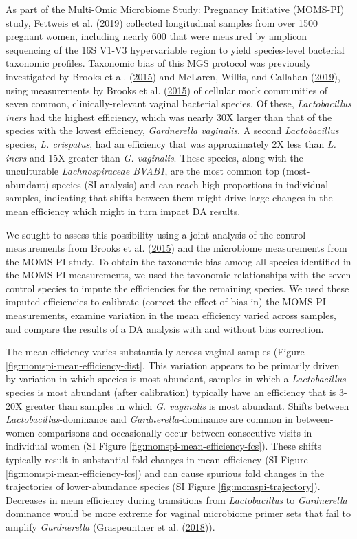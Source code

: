 \documentclass[
]{article}
\begin{document}
As part of the Multi-Omic Microbiome Study: Pregnancy Initiative (MOMS-PI) study, Fettweis et al. (\protect\hyperlink{ref-fettweis2019thev}{2019}) collected longitudinal samples from over 1500 pregnant women, including nearly 600 that were measured by amplicon sequencing of the 16S V1-V3 hypervariable region to yield species-level bacterial taxonomic profiles.
Taxonomic bias of this MGS protocol was previously investigated by Brooks et al. (\protect\hyperlink{ref-brooks2015thet}{2015}) and McLaren, Willis, and Callahan (\protect\hyperlink{ref-mclaren2019cons}{2019}), using measurements by Brooks et al. (\protect\hyperlink{ref-brooks2015thet}{2015}) of cellular mock communities of seven common, clinically-relevant vaginal bacterial species.
Of these, \emph{Lactobacillus iners} had the highest efficiency, which was nearly 30X larger than that of the species with the lowest efficiency, \emph{Gardnerella vaginalis}.
A second \emph{Lactobacillus} species, \emph{L. crispatus}, had an efficiency that was approximately 2X less than \emph{L. iners} and 15X greater than \emph{G. vaginalis}.
These species, along with the unculturable \emph{Lachnospiraceae BVAB1}, are the most common top (most-abundant) species (SI analysis) and can reach high proportions in individual samples, indicating that shifts between them might drive large changes in the mean efficiency which might in turn impact DA results.

We sought to assess this possibility using a joint analysis of the control measurements from Brooks et al. (\protect\hyperlink{ref-brooks2015thet}{2015}) and the microbiome measurements from the MOMS-PI study.
To obtain the taxonomic bias among all species identified in the MOMS-PI measurements, we used the taxonomic relationships with the seven control species to impute the efficiencies for the remaining species.
We used these imputed efficiencies to calibrate (correct the effect of bias in) the MOMS-PI measurements, examine variation in the mean efficiency varied across samples, and compare the results of a DA analysis with and without bias correction.

The mean efficiency varies substantially across vaginal samples (Figure \ref{fig:momspi-mean-efficiency-dist}.
This variation appears to be primarily driven by variation in which species is most abundant, samples in which a \emph{Lactobacillus} species is most abundant (after calibration) typically have an efficiency that is 3-20X greater than samples in which \emph{G. vaginalis} is most abundant.
Shifts between \emph{Lactobacillus}-dominance and \emph{Gardnerella}-dominance are common in between-women comparisons and occasionally occur between consecutive visits in individual women (SI Figure \ref{fig:momspi-mean-efficiency-fcs}).
These shifts typically result in substantial fold changes in mean efficiency (SI Figure \ref{fig:momspi-mean-efficiency-fcs}) and can cause spurious fold changes in the trajectories of lower-abundance species (SI Figure \ref{fig:momspi-trajectory}).
Decreases in mean efficiency during transitions from \emph{Lactobacillus} to \emph{Gardnerella} dominance would be more extreme for vaginal microbiome primer sets that fail to amplify \emph{Gardnerella} (Graspeuntner et al. (\protect\hyperlink{ref-graspeuntner2018sele}{2018})).
\end{document}
